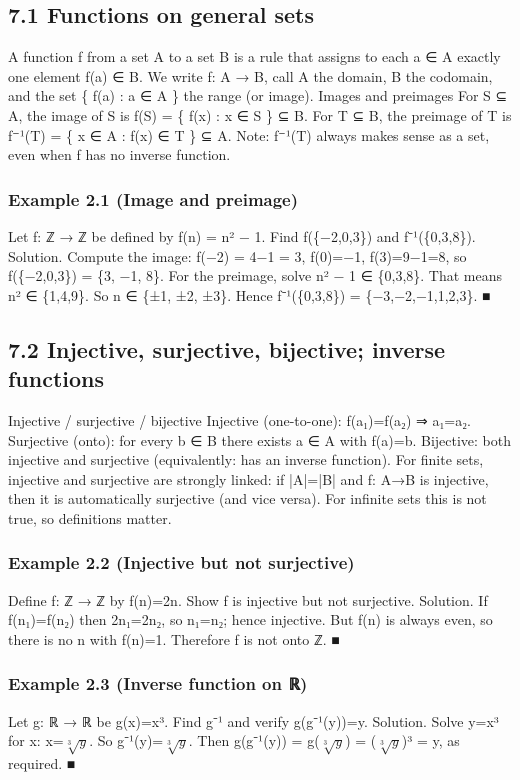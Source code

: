 \documentclass[11pt]{article}
\begin{document}
\subsection{7.1 Functions on general sets}
A function f from a set A to a set B is a rule that assigns to each a ∈ A exactly one element
f(a) ∈ B. We write f: A → B, call A the domain, B the codomain, and the set \{ f(a) : a ∈ A \}
the range (or image).
Images and preimages
For S ⊆ A, the image of S is f(S) = \{ f(x) : x ∈ S \} ⊆ B.
For T ⊆ B, the preimage of T is f⁻¹(T) = \{ x ∈ A : f(x) ∈ T \} ⊆ A.
Note: f⁻¹(T) always makes sense as a set, even when f has no inverse function.
\subsubsection*{Example 2.1 (Image and preimage)}
Let f: ℤ → ℤ be defined by f(n) = n² − 1. Find f(\{−2,0,3\}) and f⁻¹(\{0,3,8\}).
Solution. Compute the image:
f(−2) = 4−1 = 3, f(0)=−1, f(3)=9−1=8, so f(\{−2,0,3\}) = \{3, −1, 8\}.
For the preimage, solve n² − 1 ∈ \{0,3,8\}. That means n² ∈ \{1,4,9\}.
So n ∈ \{±1, ±2, ±3\}. Hence f⁻¹(\{0,3,8\}) = \{−3,−2,−1,1,2,3\}. ■

\subsection{7.2 Injective, surjective, bijective; inverse functions}
Injective / surjective / bijective
Injective (one-to-one): f(a₁)=f(a₂) ⇒ a₁=a₂.
Surjective (onto): for every b ∈ B there exists a ∈ A with f(a)=b.
Bijective: both injective and surjective (equivalently: has an inverse function).
For finite sets, injective and surjective are strongly linked: if |A|=|B| and f: A→B is injective,
then it is automatically surjective (and vice versa). For infinite sets this is not true, so
definitions matter.
\subsubsection*{Example 2.2 (Injective but not surjective)}
Define f: ℤ → ℤ by f(n)=2n. Show f is injective but not surjective.
Solution. If f(n₁)=f(n₂) then 2n₁=2n₂, so n₁=n₂; hence injective.
But f(n) is always even, so there is no n with f(n)=1. Therefore f is not onto ℤ. ■
\subsubsection*{Example 2.3 (Inverse function on ℝ)}
Let g: ℝ → ℝ be g(x)=x³. Find g⁻¹ and verify g(g⁻¹(y))=y.
Solution. Solve y=x³ for x: x=\(\sqrt[3]{y}\). So g⁻¹(y)=\(\sqrt[3]{y}\).
Then g(g⁻¹(y)) = g(\(\sqrt[3]{y}\)) = (\(\sqrt[3]{y}\))³ = y, as required. ■
\end{document}
